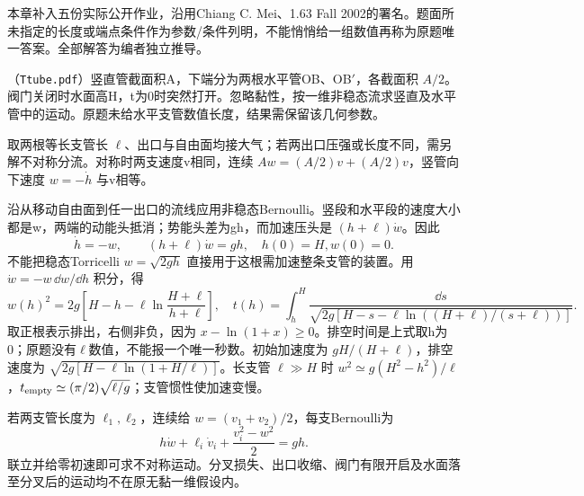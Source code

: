 本章补入五份实际公开作业，沿用Chiang C. Mei、1.63 Fall 2002的署名。题面所未指定的长度或端点条件作为参数/条件列明，不能悄悄给一组数值再称为原题唯一答案。全部解答为编者独立推导。

\begin{exercise}\label{task:fluid-Ttube}
（\texttt{Ttube.pdf}）竖直管截面积A，下端分为两根水平管OB、OB$'$，各截面积 $A/2$。阀门关闭时水面高H，t为0时突然打开。忽略黏性，按一维非稳态流求竖直及水平管中的运动。原题未给水平支管数值长度，结果需保留该几何参数。
\end{exercise}
\begin{solution}
取两根等长支管长 $\ell$、出口与自由面均接大气；若两出口压强或长度不同，需另解不对称分流。对称时两支速度v相同，连续 $Aw=(A/2)v+(A/2)v$，竖管向下速度 $w=-\dot h$ 与v相等。

沿从移动自由面到任一出口的流线应用非稳态Bernoulli。竖段和水平段的速度大小都是w，两端的动能头抵消；势能头差为gh，而加速压头是 $(h+\ell)\dot w$。因此
\[
 \dot h=-w,\qquad (h+\ell)\dot w=gh,\quad h(0)=H,w(0)=0.
\]
不能把稳态Torricelli $w=\sqrt{2gh}$ 直接用于这根需加速整条支管的装置。用 $\dot w=-w\,\dd w/\dd h$ 积分，得
\[
 w(h)^2=2g\left[H-h-\ell\ln\frac{H+\ell}{h+\ell}\right],\quad
 t(h)=\int_h^H\frac{\dd s}{\sqrt{2g[H-s-\ell\ln((H+\ell)/(s+\ell))]}}.
\]
取正根表示排出，右侧非负，因为 $x-\ln(1+x)\ge0$。排空时间是上式取h为0；原题没有\(\ell\)数值，不能报一个唯一秒数。初始加速度为 $gH/(H+\ell)$，排空速度为 $\sqrt{2g[H-\ell\ln(1+H/\ell)]}$。长支管 $\ell\gg H$ 时 $w^2\simeq g(H^2-h^2)/\ell$，$t_{\rm empty}\simeq(\pi/2)\sqrt{\ell/g}$；支管惯性使加速变慢。

若两支管长度为 $\ell_1,\ell_2$，连续给 $w=(v_1+v_2)/2$，每支Bernoulli为
\[
 h\dot w+\ell_i\dot v_i+\frac{v_i^2-w^2}{2}=gh.
\]
联立并给零初速即可求不对称运动。分叉损失、出口收缩、阀门有限开启及水面落至分叉后的运动均不在原无黏一维假设内。
\end{solution}

